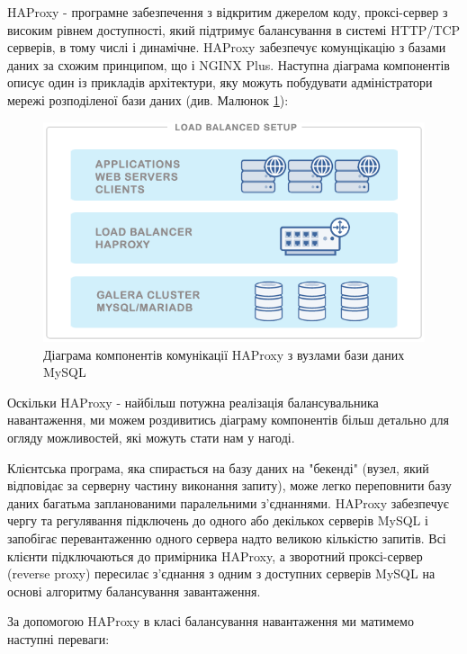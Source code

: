 \documentclass[14pt]{vakthesis}
\begin{document}
HAProxy - програмне забезпечення з відкритим джерелом коду, проксі-сервер з високим рівнем доступності, який підтримує балансування в системі HTTP/TCP серверів, в тому числі і динамічне.
HAProxy забезпечує комунцікацію з базами даних за схожим принципом, що і NGINX Plus. Наступна діаграма компонентів описує один із прикладів архітектури, яку можуть побудувати адміністратори мережі розподіленої бази даних (див. Малюнок \ref{fig:haproxy_mysql}):

\begin{figure}
\centering
\includegraphics[width=\linewidth]{images/haproxy_database_balancing.png}
     \caption{Діаграма компонентів комунікації HAProxy з вузлами бази даних MySQL}
     \label{fig:haproxy_mysql}
\end{figure}


Оскільки HAProxy - найбільш потужна реалізація балансувальника навантаження, ми можем роздивитись діаграму компонентів більш детально для огляду можливостей, які можуть стати нам у нагоді.

Клієнтська програма, яка спирається на базу даних на "бекенді" (вузел, який відповідає за серверну частину виконання запиту), може легко переповнити базу даних багатьма запланованими паралельними з'єднаннями. HAProxy забезпечує чергу та регулявання підключень до одного або декількох серверів MySQL і запобігає перевантаженню одного сервера надто великою кількістю запитів. Всі клієнти підключаються до примірника HAProxy, а зворотний проксі-сервер (reverse proxy) пересилає з'єднання з одним з доступних серверів MySQL на основі алгоритму балансування завантаження.

За допомогою HAProxy в класі балансування навантаження ми матимемо наступні переваги:
\end{document}
